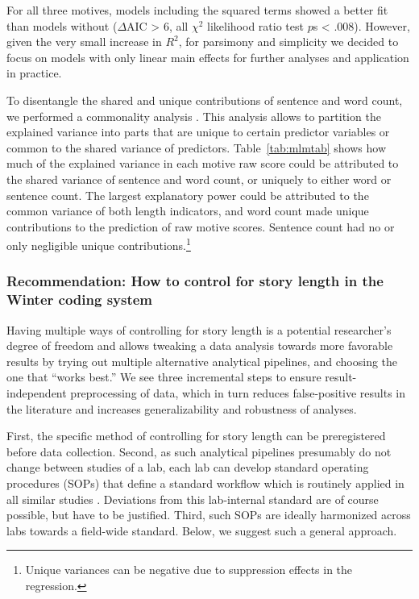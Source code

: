 \documentclass[man,a4paper,mask]{apa6}\usepackage[]{graphicx}\usepackage[]{color}
\begin{document}
For all three motives, models including the squared terms showed a better fit than models without ($\Delta$AIC > 6, all $\chi^2$ likelihood ratio test $p$s < .008). However, given the very small increase in $R^2$, for parsimony and simplicity we decided to focus on models with only linear main effects for further analyses and application in practice.


To disentangle the shared and unique contributions of sentence and word count, we performed a commonality analysis \parencite{nimon_r_2008}. This analysis allows to partition the explained variance into parts that are unique to certain predictor variables or common to the shared variance of predictors. Table~\ref{tab:mlmtab} shows how much of the explained variance in each motive raw score could be attributed to the shared variance of sentence and word count, or uniquely to either word or sentence count. The largest explanatory power could be attributed to the common variance of both length indicators, and word count made unique contributions to the prediction of raw motive scores. Sentence count had no or only negligible unique contributions.\footnote{Unique variances can be negative due to suppression effects in the regression.}


\subsubsection{Recommendation: How to control for story length in the Winter coding system}
Having multiple ways of controlling for story length is a potential researcher's degree of freedom \parencite{john_measuring_2012} and allows tweaking a data analysis towards more favorable results by trying out multiple alternative analytical pipelines, and choosing the one that ``works best.'' We see three incremental steps to ensure result-independent preprocessing of data, which in turn reduces false-positive results in the literature and increases generalizability and robustness of analyses. 

First, the specific method of controlling for story length can be preregistered before data collection. Second, as such analytical pipelines presumably do not change between studies of a lab, each lab can develop standard operating procedures (SOPs) that define a standard workflow which is routinely applied in all similar studies \parencite{lin_StandardOperatingProcedures_2016}. Deviations from this lab-internal standard are of course possible, but have to be justified. Third, such SOPs are ideally harmonized across labs towards a field-wide standard. Below, we suggest such a general approach.
\end{document}
